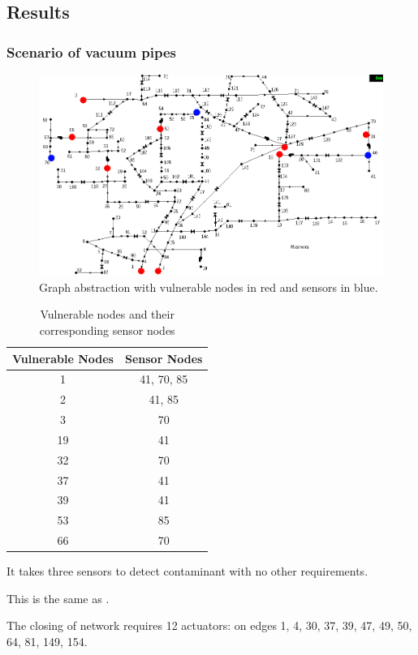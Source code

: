 \documentclass[authoryear,preprint,review,12pt]{elsarticle}
\begin{document}
\subsection{Results}
\subsubsection{Scenario of vacuum pipes}
\begin{figure}[ht]
    \includegraphics[scale=0.4]{images/netowrkSensorsOnly}\caption{Graph abstraction with vulnerable nodes in red and sensors in blue.}
\end{figure}


\begin{table}[ht]
\centering{}%
\begin{tabular}{|c|c|}
\hline
Vulnerable Nodes & Sensor Nodes\tabularnewline
\hline
\hline
1 & 41, 70, 85\tabularnewline
\hline
2 & 41, 85\tabularnewline
\hline
3 & 70\tabularnewline
\hline
19 & 41\tabularnewline
\hline
32 & 70\tabularnewline
\hline
37 & 41\tabularnewline
\hline
39 & 41\tabularnewline
\hline
53 & 85\tabularnewline
\hline
66 & 70\tabularnewline
\hline
\end{tabular}\caption{Vulnerable nodes and their corresponding sensor nodes}
\end{table}


It takes three sensors to detect contaminant with no other requirements.

This is the same as \cite{Palleti2016246}.

The closing of network requires 12 actuators: on edges 1, 4, 30, 37,
39, 47, 49, 50, 64, 81, 149, 154.
\end{document}

